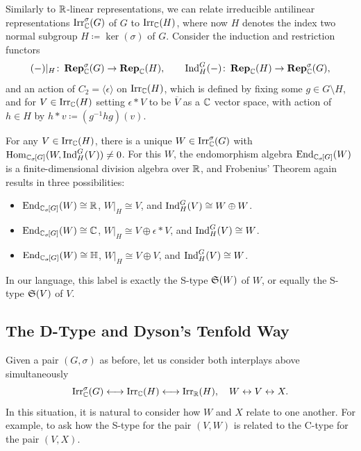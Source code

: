 Similarly to ${\mathbb R}$-linear representations, we can relate irreducible antilinear representations $\operatorname{Irr}_{{\mathbb C}}^{\sigma}(G)$ of $G$ to $\operatorname{Irr}_{{\mathbb C}}(H)$, where now $H$ denotes the index two normal subgroup $H \coloneqq \ker(\sigma)$ of $G$.
Consider the induction and restriction functors
\[
(-)|_H \colon \operatorname{\mathbf{Rep}}_{{\mathbb C}}^{\sigma}(G) \rightarrow \operatorname{\mathbf{Rep}}_{{\mathbb C}}(H), \qquad \operatorname{Ind}_H^G(-) \colon \operatorname{\mathbf{Rep}}_{{\mathbb C}}(H) \rightarrow \operatorname{\mathbf{Rep}}_{{\mathbb C}}^{\sigma}(G),
\]
and an action of $C_2 = \langle \epsilon \rangle$ on $\operatorname{Irr}_{{\mathbb C}}(H)$, which is defined by fixing some $g \in G \setminus H$, and for $V \in \operatorname{Irr}_{{\mathbb C}}(H)$ setting $\epsilon * V$ to be $\overline{V}$ as a ${\mathbb C}$ vector space, with action of $h \in H$ by $h * v \coloneqq (g^{-1} hg)(v)$.

For any $V \in \operatorname{Irr}_{{\mathbb C}}(H)$, there is a unique $W \in \operatorname{Irr}_{{\mathbb C}}^{\sigma}(G)$ with $\operatorname{Hom}_{{\mathbb C}_{\sigma}\hspace{-0.1em}[G]}(W, \operatorname{Ind}_H^G(V)) \neq 0$. For this $W$, the endomorphism algebra $\operatorname{End}_{{\mathbb C}_{\sigma}\hspace{-0.1em}[G]}(W)$ is a finite-dimensional division algebra over ${\mathbb R}$, and Frobenius' Theorem again results in three possibilities:
\begin{itemize}
    \item[(\textbf{A})] $\operatorname{End}_{{\mathbb C}_{\sigma}\hspace{-0.1em}[G]}(W) \cong {\mathbb R}$, $W|_H \cong V$, and $\operatorname{Ind}_H^G(V) \cong W \oplus W$.
    \item[(\textbf{B})] $\operatorname{End}_{{\mathbb C}_{\sigma}\hspace{-0.1em}[G]}(W) \cong {\mathbb C}$, $W|_H \cong V \oplus \epsilon * V$, and $\operatorname{Ind}_H^G(V) \cong W$.
    \item[(\textbf{C})] $\operatorname{End}_{{\mathbb C}_{\sigma}\hspace{-0.1em}[G]}(W) \cong {\mathbb H}$, $W|_H \cong V \oplus V$, and $\operatorname{Ind}_H^G(V) \cong W$.
\end{itemize}
In our language, this label is exactly the S-type ${\mathfrak S}(W)$ of $W$, or equally the S-type ${\mathfrak S}(V)$ of $V$.

\subsection*{The D-Type and Dyson's Tenfold Way}
Given a pair $(G,\sigma)$ as before, let us consider both interplays above simultaneously
\[
\operatorname{Irr}^{\sigma}_{{\mathbb C}}(G) \longleftrightarrow \operatorname{Irr}_{{\mathbb C}}(H)\longleftrightarrow \operatorname{Irr}_{{\mathbb R}}(H), \quad 
W \leftrightarrow V \leftrightarrow X.
\]
In this situation, it is natural to consider how $W$ and $X$ relate to one another. For example, to ask how the S-type for the pair $(V,W)$ is related to the C-type for the pair $(V,X)$.

